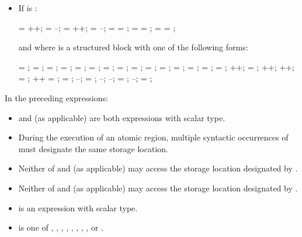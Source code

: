 \begin{ccppspecific}
\begin{itemize}
\item If  is :
\begin{ompSyntax}
 = ++;
 = --;
 = ++;
 = --;
 =  = ;
 =  =   ;
 =  =   ;
\end{ompSyntax}

and where  is a structured block with one of the following forms:

\begin{ompSyntax}
 = ;  = ;
 = ;  = ;
 = ;  =   ;
 = ;  =   ;
 =   ;  = ;
 =   ;  = ;
 = ;  = ;
 = ; ++;
 = ; ++;
++;  = ;
++\code{;}  = ;
 = ; --;
 = ; --;
--;  = ;
--;  = ;
\end{ompSyntax}
\end{itemize}

In the preceding expressions:

\begin{itemize}
\item {} and  (as applicable) are both  expressions with scalar type.

\item During the execution of an atomic region, multiple syntactic occurrences of  must
designate the same storage location.

\item Neither of  and  (as applicable) may access the storage location designated by .

\item Neither of  and  (as applicable) may access the storage location designated by .

\item {} is an expression with scalar type.

\item {} is one of \code{+}, \code{*}, \code{-}, \code{/},
\code{&}, \code{^}, \code{|}, \code{<<}, or
\code{>>}.


\end{itemize}
\end{ccppspecific}
